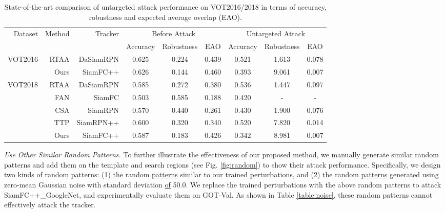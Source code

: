 \documentclass[journal]{IEEEtran}
\begin{document}
\begin{table}[t]
  \centering
  \caption{State-of-the-art comparison of untargeted attack performance on VOT2016/2018 in terms of accuracy, robustness and expected average overlap (EAO).}
  \begin{tabular}{rrrcccccc}
  \toprule
  \multirow{2}{*}[-2pt]{Dataset} & \multirow{2}{*}[-2pt]{Method} & \multirow{2}{*}[-2pt]{Tracker} & \multicolumn{3}{c}{Before Attack} & \multicolumn{3}{c}{Untargeted Attack} \\ \cmidrule{4-9}
                           &                         &                          & Accuracy   & Robustness  & EAO    & Accuracy    & Robustness    & EAO     \\ \midrule
  \multirow{2}{*}{VOT2016} & RTAA                    & DaSiamRPN                & 0.625      & 0.224       & 0.439  & 0.521       & 1.613         & 0.078   \\
                           & Ours                    & SiamFC++                 & 0.626      & 0.144       & 0.460  & 0.393       & 9.061         & 0.007   \\ \midrule
  \multirow{5}{*}{VOT2018} & RTAA                    & DaSiamRPN                & 0.585      & 0.272       & 0.380  & 0.536       & 1.447         & 0.097   \\
                           & FAN                     & SiamFC                   & 0.503      & 0.585       & 0.188  & 0.420       & -             & -       \\
                           & CSA                     & SiamRPN                  & 0.570      & 0.440       & 0.261  & 0.430       & 1.900         & 0.076   \\
                           & TTP                     & SiamRPN++                & 0.600      & 0.320       & 0.340  & 0.520       & 7.820         & 0.014   \\
                           & Ours                    & SiamFC++                 & 0.587      & 0.183       & 0.426  & 0.342       & 8.981         & 0.007   \\ \bottomrule
  \end{tabular}
  \label{tab:sota_vot}
\end{table}

\textit{Use Other Similar Random Patterns.} To further illustrate the effectiveness of our proposed method, we manually generate similar random patterns and add them on the template and search regions (see Fig. \ref{fig:random}) to show their attack performance. Specifically, we design two kinds of random patterns: (1) the random \uline{patterns} similar to our trained perturbations, and (2) the random \uline{patterns} generated using zero-mean Gaussian noise with standard deviation \uline{of} 50.0. We replace the trained perturbations with the above random patterns to attack SiamFC++\_GoogleNet, and experimentally evaluate them on GOT-Val. As shown in Table \ref{table:noise}, these random patterns cannot effectively attack the tracker.
\end{document}
